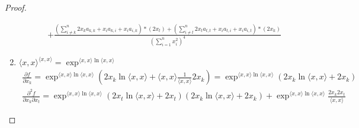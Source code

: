 \documentclass[a4paper]{article}
\begin{document}
\begin{proof}
\begin{enumerate}[label=(\alph*)]
        \begin{align*}
        &+ \frac{(\sum _{i \neq k}^n 2x_k a_{k, k} + x_i a_{k, i} + x_i a_{i, k})*(2 x_t) + (\sum _{i \neq t}^n 2x_t a_{t, t} + x_i a_{t, i} + x_i a_{i, t})*(2x_k)}{(\sum _{i = 1} ^n x_i^2)^4}
        \end{align*}
        
        \item $\langle x,x \rangle^{\langle x,x \rangle} = \exp^{\langle x,x \rangle \ln{\langle x,x \rangle}}$
        \begin{align*}
        \frac{\partial  f}{\partial x_k} = \exp^{\langle x,x \rangle \ln{\langle x,x \rangle}}(2x_k \ln{\langle x,x \rangle} + {\langle x,x \rangle} \frac{1}{{\langle x,x \rangle}}2x_k) = \exp^{\langle x,x \rangle \ln{\langle x,x \rangle}}(2x_k \ln{\langle x,x \rangle} + 2x_k)
        \end{align*}
        \begin{align*}
        \frac{\partial ^2 f}{\partial x_k \partial x_t} = \exp^{\langle x,x \rangle \ln{\langle x,x \rangle}}(2x_t \ln{\langle x,x \rangle} + 2x_t)(2x_k \ln{\langle x,x \rangle} + 2x_k) + \exp^{\langle x,x \rangle \ln{\langle x,x \rangle}} \frac{2x_k 2x_t}{\langle x,x \rangle}
        \end{align*}
    \end{enumerate}
\end{proof}
\end{document}
